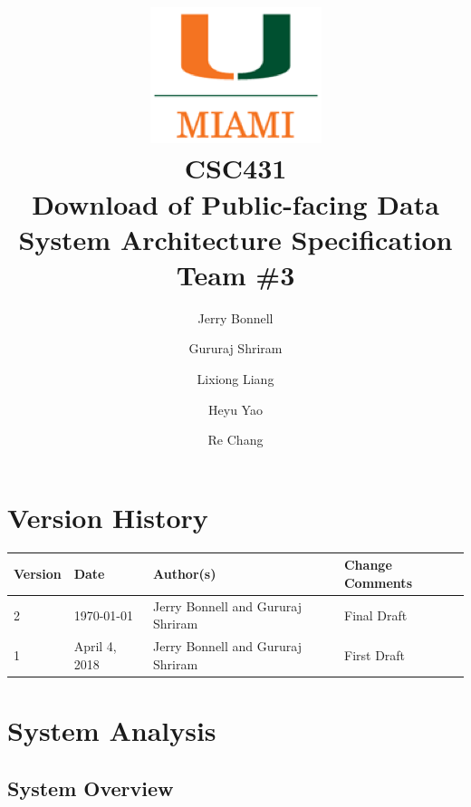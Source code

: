 \documentclass{article}
\begin{document}
\title{
	\includegraphics{images/um_logo.png} \\
	\vspace{0.1in}
	CSC431 \\
	\vspace{0.2in}
	\textbf{Download of Public-facing Data} \\
	\large System Architecture Specification \\
	Team \#3
}

\author{
	Jerry Bonnell
	\and Gururaj Shriram
	\and Lixiong Liang
	\and Heyu Yao
	\and Re Chang
}

\date{}
\maketitle

\clearpage
\section*{Version History}

\begin{tabularx}{\textwidth}{| l | l | X | l |}
	\hline
	\textbf{Version} & \textbf{Date} & \textbf{Author(s)} & \textbf{Change Comments} \\
	\hline
	2 & \today & Jerry Bonnell and Gururaj Shriram & Final Draft \\ 
	\hline
	1 & April 4, 2018 & Jerry Bonnell and Gururaj Shriram & First Draft \\
	\hline
\end{tabularx}

\clearpage
\tableofcontents

\clearpage
\listoffigures
\listoftables

\clearpage

\section{System Analysis}

\subsection{System Overview}
\end{document}
